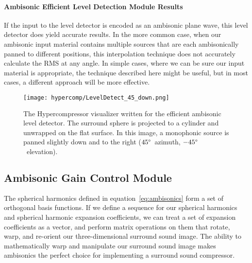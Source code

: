 \paragraph{Ambisonic Efficient Level Detection Module Results}If the
input to the level detector is encoded as an ambisonic plane wave,
this level detector does yield accurate results.  In the more common
case, when our ambisonic input material contains multiple sources that
are each ambisonically panned to different positions, this
interpolation technique does not accurately calculate the RMS at any
angle. In simple cases, where we can be sure our input material is
appropriate, the technique described here might be useful, but in most
cases, a different approach will be more effective.

\begin{figure}[h]
  \texttt{[image: hypercomp/LevelDetect\_45\_down.png]}
  \caption{The Hypercompressor visualizer written for the efficient
    ambisonic level detector. The surround sphere is projected to a
    cylinder and unwrapped on the flat surface. In this image, a
    monophonic source is panned slightly down and to the right
    ($45\degree$~azimuth, $-45\degree$~elevation).}
  \label{fig:hypercomp-inf-map-angle}
\end{figure}

\subsection{Ambisonic Gain Control Module}
\label{sec:ambis-gain-contr}
The spherical harmonics defined in equation~\ref{eq:ambisonics} form a
set of orthogonal basis functions. If we define a sequence for our
spherical harmonics and spherical harmonic expansion coefficients, we
can treat a set of expansion coefficients as a vector, and perform
matrix operations on them that rotate, warp, and re-orient our
three-dimensional surround sound image.\cite{Pomberger2011} The
ability to mathematically warp and manipulate our surround sound image
makes ambisonics the perfect choice for implementing a surround sound
compressor.

